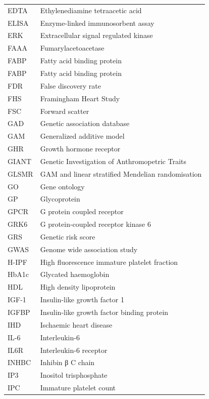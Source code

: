 \documentclass[11pt,twoside]{bristolthesis}
\begin{document}
\begin{abbreviations}
\begin{longtable}[t]{ll}
    \addlinespace
    EDTA & Ethylenediamine tetraacetic acid\\
    ELISA & Enzyme-linked immunosorbent assay\\
    ERK & Extracellular signal regulated kinase\\
    FAAA & Fumarylacetoacetase\\
    FABP & Fatty acid binding protein\\
    \addlinespace
    FABP & Fatty acid binding protein\\
    FDR & False discovery rate\\
    FHS & Framingham Heart Study\\
    FSC & Forward scatter\\
    GAD & Genetic association database\\
    \addlinespace
    GAM & Generalized additive model\\
    GHR & Growth hormone receptor\\
    GIANT & Genetic Investigation of Anthromopetric Traits\\
    GLSMR & GAM and linear stratified Mendelian randomisation\\
    GO & Gene ontology\\
    \addlinespace
    GP & Glycoprotein\\
    GPCR & G protein coupled receptor\\
    GRK6 & G protein-coupled receptor kinase 6\\
    GRS & Genetic risk score\\
    GWAS & Genome wide association study\\
    \addlinespace
    H-IPF & High fluorescence immature platelet fraction\\
    HbA1c & Glycated haemoglobin\\
    HDL & High density lipoprotein\\
    IGF-1 & Insulin-like growth factor 1\\
    IGFBP & Insulin-like growth factor binding protein\\
    \addlinespace
    IHD & Ischaemic heart disease\\
    IL-6 & Interleukin-6\\
    IL6R & Interleukin-6 receptor\\
    INHBC & Inhibin β C chain\\
    IP3 & Inositol trisphosphate\\
    \addlinespace
    IPC & Immature platelet count\\

\end{longtable}
\end{abbreviations}
\end{document}

